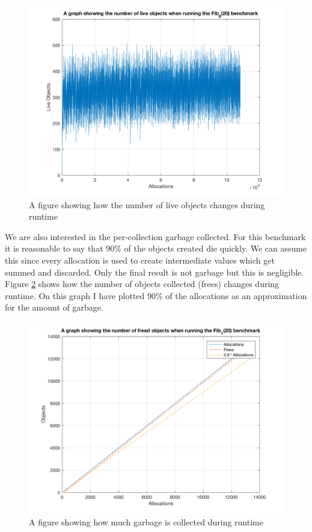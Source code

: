 \documentclass[../diss.tex]{subfiles}
\begin{document}
\begin{figure}
    \centering
    \includegraphics[max width=\linewidth]{figs/fib8.png}
    \caption{A figure showing how the number of live objects changes during runtime}
    \label{fig:fibngraph}
\end{figure}

We are also interested in the per-collection garbage collected. For this benchmark it is reasonable to say that 90\% of the objects created die quickly. We can assume this since every allocation is used to create intermediate values which get summed and discarded. Only the final result is not garbage but this is negligible. Figure \ref{fig:fibgarbagegraph} shows how the number of objects collected (frees) changes during runtime. On this graph I have plotted 90\% of the allocations as an approximation for the amount of garbage.

\begin{figure}
    \centering
    \includegraphics[max width=\linewidth]{figs/fibgarbage.png}
    \caption{A figure showing how much garbage is collected during runtime}
    \label{fig:fibgarbagegraph}
\end{figure}
\end{document}
